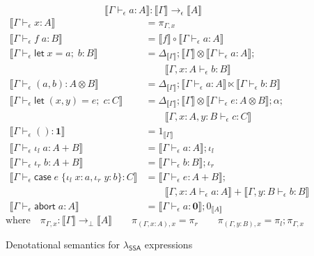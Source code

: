 \documentclass[acmsmall,screen,review]{acmart}
\newcommand{\mb}[1]{\ensuremath{\mathbf{#1}}}
\newcommand{\ms}[1]{\ensuremath{\mathsf{#1}}}
\newcommand{\lto}{:}
\newcommand{\linl}[1]{\iota_l\;{#1}}
\newcommand{\linr}[1]{\iota_r\;{#1}}
\newcommand{\labort}[1]{\ms{abort}\;{#1}}
\newcommand{\letexpr}[3]{\ensuremath{\ms{let}\;#1 = #2;\;#3}}
\newcommand{\caseexpr}[5]{\ms{case}\;#1\;\{\linl{#2} \lto #3, \linr{#4} \lto #5\}}
\newcommand{\bhyp}[2]{#1 : #2}
\newcommand{\hasty}[4]{#1 \vdash_{#2} #3: {#4}}
\newcommand{\dnt}[1]{\llbracket{#1}\rrbracket}
\newcommand{\isotopessa}{\(\lambda_{\ms{SSA}}\)}
\begin{document}
\begin{figure}
  \begin{equation*}
    \boxed{\dnt{\hasty{\Gamma}{\epsilon}{a}{A}} : \dnt{\Gamma} \to_\epsilon \dnt{A}}
  \end{equation*}
  \begin{align*}
    \dnt{\hasty{\Gamma}{\epsilon}{x}{A}} &= \pi_{\Gamma, x} \\
    \dnt{\hasty{\Gamma}{\epsilon}{f\;a}{B}} 
      &= \dnt{f} \circ \dnt{\hasty{\Gamma}{\epsilon}{a}{A}} \\
    \dnt{\hasty{\Gamma}{\epsilon}{\letexpr{x}{a}{b}}{B}}
      &= \Delta_{\dnt{\Gamma}}
      ; \dnt{\Gamma} \otimes \dnt{\hasty{\Gamma}{\epsilon}{a}{A}} ;
      \\&\qquad
      \dnt{\hasty{\Gamma, \bhyp{x}{A}}{\epsilon}{b}{B}}
      \\
    \dnt{\hasty{\Gamma}{\epsilon}{(a, b)}{A \otimes B}} 
      &= \Delta_{\dnt{\Gamma}}
      ; \dnt{\hasty{\Gamma}{\epsilon}{a}{A}} \ltimes \dnt{\hasty{\Gamma}{\epsilon}{b}{B}}
      \\
    \dnt{\hasty{\Gamma}{\epsilon}{\letexpr{(x, y)}{e}{c}}{C}}
      &= \Delta_{\dnt{\Gamma}}
      ; \dnt{\Gamma} \otimes \dnt{\hasty{\Gamma}{\epsilon}{e}{A \otimes B}} ; \alpha;
      \\&\qquad
      \dnt{\hasty{\Gamma, \bhyp{x}{A}, \bhyp{y}{B}}{\epsilon}{c}{C}}
      \\
    \dnt{\hasty{\Gamma}{\epsilon}{()}{\mb{1}}} &= 1_{\dnt{\Gamma}} \\
    \dnt{\hasty{\Gamma}{\epsilon}{\linl{a}}{A + B}}
      &= \dnt{\hasty{\Gamma}{\epsilon}{a}{A}} ; \iota_l \\
    \dnt{\hasty{\Gamma}{\epsilon}{\linr{b}}{A + B}}
      &= \dnt{\hasty{\Gamma}{\epsilon}{b}{B}} ; \iota_r \\
    \dnt{\hasty{\Gamma}{\epsilon}{\caseexpr{e}{x}{a}{y}{b}}{C}}
      &= \dnt{\hasty{\Gamma}{\epsilon}{e}{A + B}}
      ; \\& \qquad
      \dnt{\hasty{\Gamma, \bhyp{x}{A}}{\epsilon}{a}{A}}
      + \dnt{\hasty{\Gamma, \bhyp{y}{B}}{\epsilon}{b}{B}}
      \\
    \dnt{\hasty{\Gamma}{\epsilon}{\labort{a}}{A}} 
      &= \dnt{\hasty{\Gamma}{\epsilon}{a}{\mb{0}}} ; 0_{\dnt{A}}
  \end{align*}
  \begin{equation*}
    \text{where} \quad \boxed{\pi_{\Gamma, x} : \dnt{\Gamma} \to_\bot \dnt{A}} \qquad
    \pi_{(\Gamma, x : A), x} = \pi_r \qquad
    \pi_{(\Gamma, y : B), x} = \pi_l ; \pi_{\Gamma, x}
  \end{equation*}
  \caption{Denotational semantics for \isotopessa{} expressions}
  \label{fig:ssa-expr-sem}
\end{figure}
\end{document}
